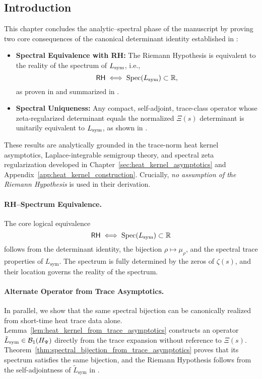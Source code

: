 \subsection*{Introduction}
\label{sec:intro_spectral_implications}

This chapter concludes the analytic–spectral phase of the manuscript by proving two core consequences of the canonical determinant identity established in :

\begin{itemize}
  \item \textbf{Spectral Equivalence with RH:} The Riemann Hypothesis is equivalent to the reality of the spectrum of \( L_{\mathrm{sym}} \), i.e.,
  \[
  \mathsf{RH} \iff \operatorname{Spec}(L_{\mathrm{sym}}) \subset \mathbb{R},
  \]
  as proven in  and summarized in .
  
  \item \textbf{Spectral Uniqueness:} Any compact, self-adjoint, trace-class operator whose zeta-regularized determinant equals the normalized \( \Xi(s) \) determinant is unitarily equivalent to \( L_{\mathrm{sym}} \), as shown in .
\end{itemize}

These results are analytically grounded in the trace-norm heat kernel asymptotics, Laplace-integrable semigroup theory, and spectral zeta regularization developed in Chapter~\ref{sec:heat_kernel_asymptotics} and Appendix~\ref{app:heat_kernel_construction}. Crucially, \textit{no assumption of the Riemann Hypothesis} is used in their derivation.

\paragraph{RH–Spectrum Equivalence.}
The core logical equivalence
\[
\mathsf{RH} \iff \operatorname{Spec}(L_{\mathrm{sym}}) \subset \mathbb{R}
\]
follows from the determinant identity, the bijection \( \rho \mapsto \mu_\rho \), and the spectral trace properties of \( L_{\mathrm{sym}} \). The spectrum is fully determined by the zeros of \( \zeta(s) \), and their location governs the reality of the spectrum.

\paragraph{Alternate Operator from Trace Asymptotics.}
In parallel, we show that the same spectral bijection can be canonically realized from short-time heat trace data alone. Lemma~\ref{lem:heat_kernel_from_trace_asymptotics} constructs an operator \( \tilde{L}_{\mathrm{sym}} \in \mathcal{B}_1(H_{\Psi}) \) directly from the trace expansion without reference to \( \Xi(s) \). Theorem~\ref{thm:spectral_bijection_from_trace_asymptotics} proves that its spectrum satisfies the same bijection, and the Riemann Hypothesis follows from the self-adjointness of \( \tilde{L}_{\mathrm{sym}} \) in .

